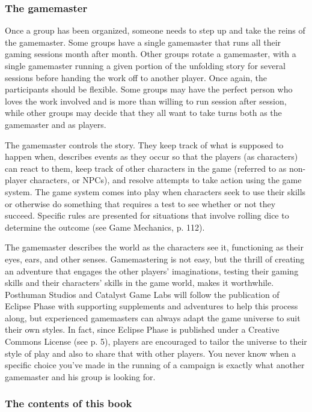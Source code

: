 \subsubsection{The gamemaster} \label{sec:gamemaster} 

Once a group has been organized, someone needs to step up and take the reins of the gamemaster. Some groups have a single gamemaster that runs all their gaming sessions month after month. Other groups rotate a gamemaster, with a single gamemaster running a given portion of the unfolding story for several sessions before handing the work off to another player. Once again, the participants should be flexible. Some groups may have the perfect person who loves the work involved and is more than willing to run session after session, while other groups may decide that they all want to take turns both as the gamemaster and as players. 

The gamemaster controls the story. They keep track of what is supposed to happen when, describes events as they occur so that the players (as characters) can react to them, keep track of other characters in the game (referred to as non-player characters, or NPCs), and resolve attempts to take action using the game system. The game system comes into play when characters seek to use their skills or otherwise do something that requires a test to see whether or not they succeed. Specific rules are presented for situations that involve rolling dice to determine the outcome (see Game Mechanics, p. 112). 

The gamemaster describes the world as the characters see it, functioning as their eyes, ears, and other senses. Gamemastering is not easy, but the thrill of creating an adventure that engages the other players' imaginations, testing their gaming skills and their characters' skills in the game world, makes it worthwhile. Posthuman Studios and Catalyst Game Labs will follow the publication of Eclipse Phase with supporting supplements and adventures to help this process along, but experienced gamemasters can always adapt the game universe to suit their own styles. In fact, since Eclipse Phase is published under a Creative Commons License (see p. 5), players are encouraged to tailor the universe to their style of play and also to share that with other players. You never know when a specific choice you've made in the running of a campaign is exactly what another gamemaster and his group is looking for. 

\subsubsection{The contents of this book} \label{sec:contents-this-book} 

